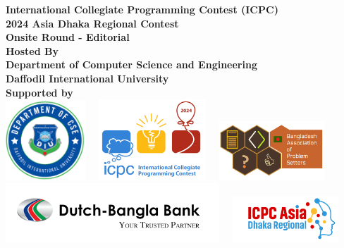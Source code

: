 \documentclass[11pt,a4paper]{article}
\begin{document}
\begin{titlepage}
    \begin{center}
        \textbf{\large International Collegiate Programming Contest (ICPC)\\
        2024 Asia Dhaka Regional Contest\\
        Onsite Round - Editorial\\
        }
        \vspace{3cm}
        \textbf{\large Hosted By \\
        Department of Computer Science and Engineering\\
        Daffodil International University\\}
        \vspace{7cm}
        \textbf{\large Supported by\\}
        \vspace{1cm}
        \includegraphics[width=3cm]{images/diu.png} \ \ 
        \includegraphics[width=4cm]{images/icpc.png} \ \ 
        \includegraphics[width=4cm]{images/baps.png} \\
        \vspace{1cm}
        \includegraphics[width=8cm]{images/dbbl.png} \ \ 
        \includegraphics[width=4cm]{images/regional.png} \ \ 
        
    \end{center}
\end{titlepage}

\begingroup
\let\clearpage\relax












\endgroup
\end{document}
